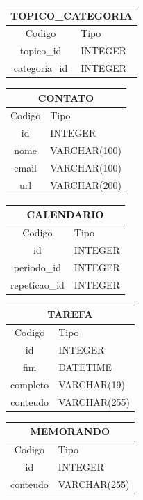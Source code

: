 \documentclass[a4paper,12pt]{article}
\begin{document}
\begin{multicols}{2}
		\begin{tabular}{|c|l|} \hline
			\multicolumn{2}{|c|}{TOPICO\_CATEGORIA} \\ \hline
			Codigo & Tipo \\ \hline
			topico\_id  & INTEGER \\
			categoria\_id & INTEGER \\ \hline
		\end{tabular}
				
		\begin{tabular}{|c|l|} \hline
			\multicolumn{2}{|c|}{CONTATO} \\ \hline
			Codigo & Tipo \\ \hline
			id & INTEGER \\
			nome & VARCHAR(100) \\ 
			email & VARCHAR(100) \\
			url & VARCHAR(200) \\ \hline
		\end{tabular}
		
		\begin{tabular}{|c|l|} \hline
			\multicolumn{2}{|c|}{CALENDARIO} \\ \hline
			Codigo & Tipo \\ \hline
			id & INTEGER \\
			periodo\_id & INTEGER \\ 
			repeticao\_id & INTEGER \\ \hline
		\end{tabular}
		
		\begin{tabular}{|c|l|} \hline
			\multicolumn{2}{|c|}{TAREFA} \\ \hline
			Codigo & Tipo \\ \hline
			id & INTEGER \\
			fim & DATETIME \\ 
			completo & VARCHAR(19) \\
			conteudo & VARCHAR(255) \\ \hline
		\end{tabular}

		\begin{tabular}{|c|l|} \hline
			\multicolumn{2}{|c|}{MEMORANDO} \\ \hline
			Codigo & Tipo \\ \hline
			id & INTEGER \\
			conteudo & VARCHAR(255) \\ \hline
		\end{tabular}


\end{multicols}
\end{document}
